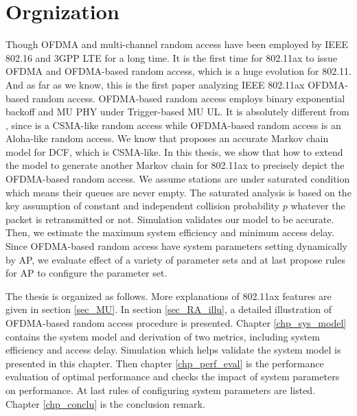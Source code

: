 \section{Orgnization}
Though OFDMA and multi-channel random access have been employed by IEEE 802.16 and 3GPP LTE for a long time.
It is the first time for 802.11ax to issue OFDMA and OFDMA-based random access, which is a huge evolution for 802.11.
And as far as we know, this is the first paper analyzing IEEE 802.11ax OFDMA-based random access. 
OFDMA-based random access employs binary exponential backoff and MU PHY under Trigger-based MU UL.
It is absolutely different from \cite{GeneralizedOFDMACSMACA}, since \cite{GeneralizedOFDMACSMACA} is a CSMA-like random access while OFDMA-based random access is an Aloha-like random access.
We know that \cite{bianchi2000performance} proposes an accurate Markov chain model for DCF, which is CSMA-like.
In this thesis, we show that how to extend the model to generate another Markov chain for 802.11ax to precisely depict the OFDMA-based random access.
We assume stations are under saturated condition which means their queues are never empty.
The saturated analysis is based on the key assumption of constant and independent collision probability $p$ whatever the packet is retransmitted or not.
Simulation validates our model to be accurate.
Then, we estimate the maximum system efficiency and minimum access delay. 
Since OFDMA-based random access have system parameters setting dynamically by AP, we evaluate effect of a variety of parameter sets and at last propose rules for AP to configure the parameter set. 


The thesis is organized as follows. 
More explanations of 802.11ax features are given in section \ref{sec_MU}. In section \ref{sec_RA_illu}, a detailed illustration of OFDMA-based random access procedure is presented.
Chapter \ref{chp_sys_model} contains the system model and derivation of two metrics, including system efficiency and access delay. 
Simulation which helps validate the system model is presented in this chapter.
Then chapter \ref{chp_perf_eval} is the performance evaluation of optimal performance and checks the impact of system parameters on performance.
At last rules of configuring system parameters are listed.
Chapter \ref{chp_conclu} is the conclusion remark.

%
%
%
